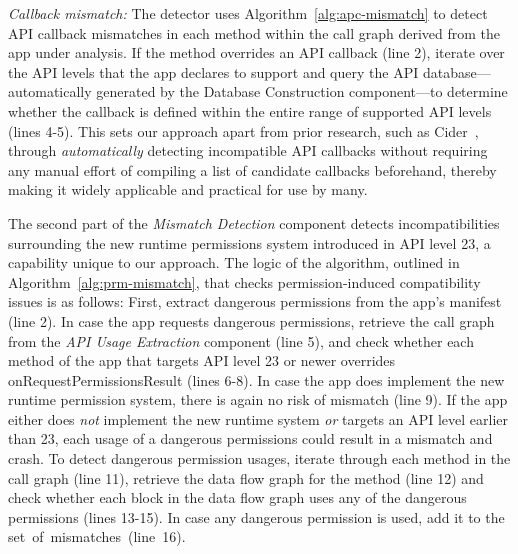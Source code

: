 \textit{Callback mismatch:} %
The detector uses %
Algorithm~\ref{alg:apc-mismatch}
to detect API callback mismatches in each method within the call graph derived from the app under analysis.
If the method overrides an API callback
(line 2), iterate over the API levels that the app declares to support and query
the API database---automatically generated by the Database Construction
component---to determine whether the callback is defined within the entire range
of supported API levels (lines 4-5). This sets our approach apart from prior
research, such as {\sc Cider}~\cite{wu2017measuring}, through
\emph{automatically} detecting incompatible API callbacks without requiring any
manual effort of compiling a list of candidate callbacks beforehand, thereby
making it widely applicable and practical for use by many.





The second part of the \textit{Mismatch Detection} component detects
incompatibilities surrounding the new runtime permissions system introduced in
API level 23, a capability unique to our approach.
The logic of the algorithm, %
outlined in Algorithm~\ref{alg:prm-mismatch},
that checks permission-induced compatibility issues is as follows:
First, extract dangerous permissions from the app's manifest (line 2).  
In case the app
requests dangerous permissions, retrieve the call graph from the \textit{API Usage
Extraction} component (line 5), and check whether each method of the app that
targets API level 23 or newer overrides {\sf onRequestPermissionsResult} (lines
6-8). In case the app does implement the new runtime permission system, there
is again no risk of mismatch (line 9).  If the app either does \emph{not} implement
the new runtime system \emph{or} targets an API level earlier than
23, each usage of a dangerous permissions could result in a mismatch and crash.
To detect dangerous permission usages, iterate through each method in the call
graph (line 11), retrieve the data flow graph for the method (line 12) and check
whether each block in the data flow graph uses any of the dangerous permissions
(lines 13-15). In case any dangerous permission is used, add it to the
set~of~mismatches~(line~16).





